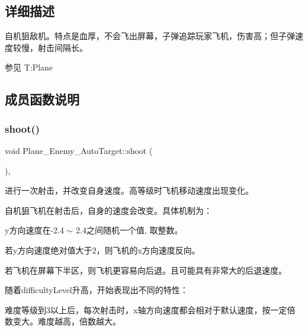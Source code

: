 \subsection{详细描述}
自机狙敌机。特点是血厚，不会飞出屏幕，子弹追踪玩家飞机，伤害高；但子弹速度较慢，射击间隔长。 

\begin{DoxySeeAlso}{参见}
T\+:\+Plane


\end{DoxySeeAlso}


\subsection{成员函数说明}
\mbox{\label{class_plane___enemy___auto_target_a18e2115af4e2ebb50c920ee9ab2e42ad}} 
\subsubsection{\texorpdfstring{shoot()}{shoot()}}
{\footnotesize\ttfamily void Plane\+\_\+\+Enemy\+\_\+\+Auto\+Target\+::shoot (\begin{DoxyParamCaption}{ }\end{DoxyParamCaption})\hspace{0.3cm}{\ttfamily [override]}, {\ttfamily [virtual]}}



进行一次射击，并改变自身速度。高等级时飞机移动速度出现变化。 

自机狙飞机在射击后，自身的速度会改变。具体机制为：
\begin{DoxyItemize}
\item y方向速度在-\/2.4 $\sim$ 2.\+4之间随机一个值, 取整数。
\item 若y方向速度绝对值大于2，则飞机的x方向速度反向。
\item 若飞机在屏幕下半区，则飞机更容易向后退。且可能具有非常大的后退速度。
\end{DoxyItemize}

随着difficulty\+Level升高，开始表现出不同的特性：
\begin{DoxyItemize}
\item 难度等级到3以上后，每次射击时，x轴方向速度都会相对于默认速度，按一定倍数变大。难度越高，倍数越大。 
\end{DoxyItemize}

